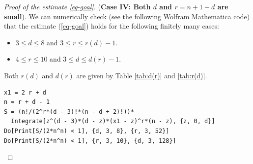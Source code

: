 \documentclass[12pt]{amsart}
\newtheorem{lem}[thm]{Lemma}
\theoremstyle{definition}
\newtheorem{ex}[thm]{Example}
\def\dif{{\rm d}}
\begin{document}
\begin{proof}[Proof of the estimate \eqref{eq-goal}]
(\textbf{Case IV: Both $d$ and $r=n+1-d$ are small}).
We can numerically check (see the following Wolfram Mathematica code) that the estimate (\ref{eq-goal}) holds for the following finitely many cases:
\begin{itemize}
    \item $3\le d\le 8$ and $3\le r\le r(d)-1$. 
\item
$4\le r\le 10$ and $3\le d\le d(r)-1$. 
\end{itemize}
Both $r(d)$ and $d(r)$ are given by Table \ref{tab:d(r)} and \ref{tab:r(d)}.
\begin{lstlisting}
x1 = 2 r + d
n = r + d - 1
S = (n!/(2^r*(d - 3)!*(n - d + 2)!))*
  Integrate[z^(d - 3)*(d - z)*(x1 - z)^r*(n - z), {z, 0, d}]
Do[Print[S/(2*n^n) < 1], {d, 3, 8}, {r, 3, 52}]
Do[Print[S/(2*n^n) < 1], {r, 3, 10}, {d, 3, 128}]
\end{lstlisting}
\end{proof}



\end{document}
